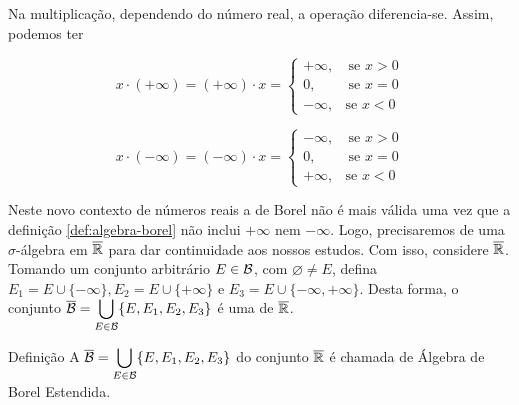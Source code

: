 	\vspace{-0.4cm}
    Na multiplicação, dependendo do número real, a operação diferencia-se.
    Assim, podemos ter
    \vspace{-1cm}
    \begin{multicols}{2}
    $$
    x \cdot (+\infty) = (+\infty) \cdot x =
    \left\{\begin{array}{cc}
          +\infty, & \ \textrm{se } x > 0\\
          0, & \ \textrm{se } x = 0\\
          - \infty, & \textrm{se } x < 0
    \end{array}\right.
    $$
    
    $$
    x \cdot (-\infty) = (-\infty) \cdot x =
    \left\{\begin{array}{cc}
          -\infty, & \ \textrm{se } x > 0\\
          0, & \ \textrm{se } x = 0\\
          + \infty, & \textrm{se } x < 0
    \end{array}\right.
    $$  
    \end{multicols}
	\vspace{-0.4cm}
    Neste novo contexto de números reais a \sigal de Borel não é mais válida uma vez que a definição \ref{def:algebra-borel} não inclui $+\infty$ nem $-\infty$.
    Logo, precisaremos de uma $\sigma$-álgebra em $\operatorname{\overline{\mathbb{R}}}$ para dar continuidade aos nossos estudos. 
    Com isso, considere $\operatorname{\overline{\mathbb{R}}}$.
    Tomando um conjunto arbitrário $E \in \operatorname{\mathcal{B}}$, com $\varnothing \neq E$, defina $E_1 = E \cup \{-\infty\}, E_2 = E \cup \{+\infty\}$ e $E_3 = E \cup \{-\infty, +\infty\}$. 
    Desta forma, o conjunto $\overline{\operatorname{\mathcal{B}}} = \displaystyle \bigcup_{E \in \operatorname{\mathcal{B}}} \{E, E_1, E_2, E_3\}$ é uma \sigal de $\operatorname{\overline{\mathbb{R}}}$.
    \begin{comment}
    Com efeito, se $E \in \borel$, então é um intervalo aberto conforme o teorema \ref{teo:equiv-borel}.
    Assim, $E_1, E_2, E_3$ e $E_4$ serão intervalos do tipo $[-\infty,x)$ ou $(x, +\infty]$ que são elementos de $\borel$ acrescidos de $+\infty$ ou $-\infty$. 
    Deste modo, é fácil verificar que se um elemento $A \in \xborel$, então $A^c \in \xborel$.
    Além disso, a união enumerável é, no máximo, o intervalo $[-\infty,+\infty]$ que é exatamente $\xreta$.
    Desta forma, $\xborel$ é uma \sigal de $\xreta$.
    	
    \end{comment}
    
    \begin{env}{Definição}
    \label{def:algebra-borel-estendida}
        A \sigal $\overline{\operatorname{\mathcal{B}}} = \displaystyle \bigcup_{E \in \operatorname{\mathcal{B}}} \{E, E_1, E_2, E_3\}$ do conjunto $\operatorname{\overline{\mathbb{R}}}$ é chamada de Álgebra de Borel Estendida. 
        \vspace{-0.2cm}
    \end{env}

